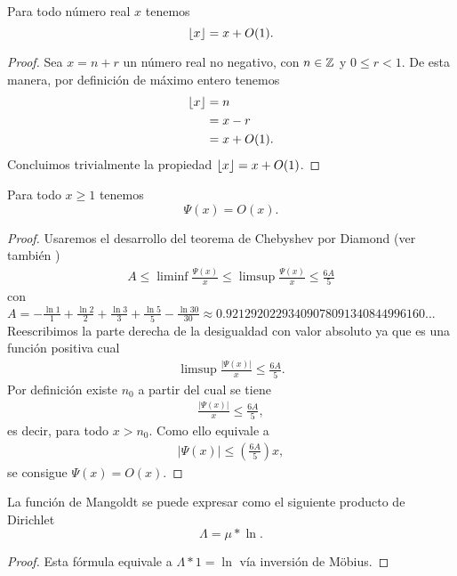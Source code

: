 \begin{lemma}\label{lem11}
Para todo n\'umero real $x$ tenemos
\[
\left\lfloor x \right\rfloor = x + O(1).
\]
\end{lemma}

\begin{proof}
Sea $x = n + r$ un n\'umero real no negativo, con $n \in \mathbb{Z}$ y $0 \leq r < 1$. 
De esta manera, por definici\'on de m\'aximo entero tenemos
\begin{align}
\left\lfloor x \right\rfloor &= n \\
&= x - r \\
&= x + O(1).
\end{align}
Concluimos trivialmente la propiedad $\left\lfloor x \right\rfloor = x + O(1)$.
\end{proof}

\begin{lemma}\label{lem12}
Para todo $x \geq 1$ tenemos
\[
\Psi(x) = O(x).
\]
\end{lemma}

\begin{proof}
Usaremos el desarrollo del teorema de Chebyshev por Diamond \cite{Diamond} (ver tambi\'en \cite{Apostol}) 
\begin{align}
A \leq \liminf \frac{\Psi(x)}{x} \leq \limsup \frac{\Psi(x)}{x} \leq \frac{6A}{5}
\end{align}
con $A = -\frac{\ln 1}{1} + \frac{\ln 2}{2} + \frac{\ln 3}{3} + \frac{\ln 5}{5} - \frac{\ln 30}{30} \approx 0.92129202293409078091340844996160...$
Reescribimos la parte derecha de la desigualdad con valor absoluto ya que es una funci\'on positiva cual
\begin{align}
\limsup \frac{|\Psi(x)|}{x} \leq \frac{6A}{5}.
\end{align}
Por definici\'on existe $n_0$ a partir del cual se tiene 
\begin{align}
\frac{|\Psi(x)|}{x} \leq \frac{6A}{5},
\end{align}
es decir, para todo $x > n_0$.
Como ello equivale a
\begin{align}
|\Psi(x)| \leq \left(\frac{6A}{5}\right) x,
\end{align}
se consigue $\Psi(x) = O(x)$.
\end{proof}

\begin{lemma}\label{lem13}
La funci\'on de Mangoldt se puede expresar como el siguiente producto de Dirichlet
$$\Lambda = \mu * \ln.$$
\end{lemma}
\begin{proof}
Esta f\'ormula equivale a  $\Lambda * 1 = \ln$ v\'ia  inversi\'on de M\"obius.  
\end{proof}

